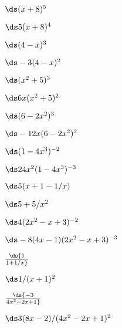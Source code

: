 \begin{exercises}
\begin{exercise} $\ds (x+8)^5$
\begin{answer} $\ds 5(x+8)^4$
\end{answer}\end{exercise}

\begin{exercise} $\ds (4-x)^3$
\begin{answer} $\ds -3(4-x)^2$
\end{answer}\end{exercise}

\begin{exercise} $\ds (x^2+5)^3$
\begin{answer} $\ds 6x(x^2+5)^2$
\end{answer}\end{exercise}

\begin{exercise} $\ds (6-2x^2)^3$
\begin{answer} $\ds -12x(6-2x^2)^2$
\end{answer}\end{exercise}

\begin{exercise} $\ds (1-4x^3)^{-2}$
\begin{answer} $\ds 24x^2(1-4x^3)^{-3}$
\end{answer}\end{exercise}

\begin{exercise} $\ds 5(x+1-1/x)$
\begin{answer} $\ds 5+5/x^2$
\end{answer}\end{exercise}

\begin{exercise} $\ds 4(2x^2-x+3)^{-2}$
\begin{answer} $\ds -8(4x-1)(2x^2-x+3)^{-3}$
\end{answer}\end{exercise}

\begin{exercise} $\ds {1\over 1+1/x}$
\begin{answer} $\ds 1/(x+1)^2$
\end{answer}\end{exercise}

\begin{exercise} $\ds {-3\over 4x^2-2x+1}$
\begin{answer} $\ds 3(8x-2)/(4x^2-2x+1)^2$
\end{answer}\end{exercise}


\end{exercises}
